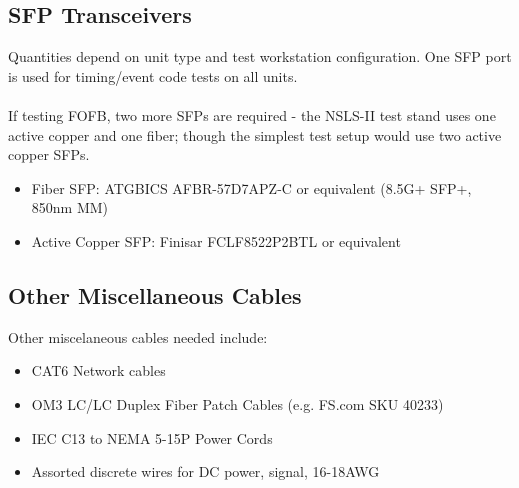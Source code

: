 \subsection{SFP Transceivers}
Quantities depend on unit type and test workstation configuration. One SFP port is used for timing/event code tests on all units.\\\\
If testing FOFB, two more SFPs are required - the NSLS-II test stand uses one active copper and one fiber; though the simplest test setup would use two active copper SFPs. 
\begin{itemize}
	\item Fiber SFP: ATGBICS AFBR-57D7APZ-C or equivalent (8.5G+ SFP+, 850nm MM)
	\item Active Copper SFP: Finisar FCLF8522P2BTL or equivalent
\end{itemize}

\subsection{Other Miscellaneous Cables}
Other miscelaneous cables needed include:
\begin{itemize}
	\item CAT6 Network cables
	\item OM3 LC/LC Duplex Fiber Patch Cables (e.g. FS.com SKU 40233)
	\item IEC C13 to NEMA 5-15P Power Cords
	\item Assorted discrete wires for DC power, signal, 16-18AWG
\end{itemize}